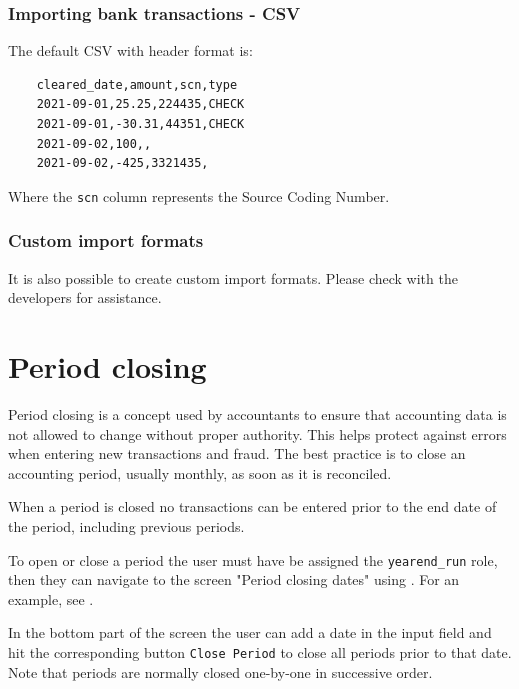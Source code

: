 \subsubsection{Importing bank transactions - CSV}
\label{subsec-importing-bank-transactions-csv}

The default CSV with header format is:
\begin{verbatim}
	cleared_date,amount,scn,type
	2021-09-01,25.25,224435,CHECK
	2021-09-01,-30.31,44351,CHECK
	2021-09-02,100,,
	2021-09-02,-425,3321435,
\end{verbatim}

Where the \texttt{scn} column represents the Source Coding Number.

\subsubsection{Custom import formats}
\label{subsec-importing-bank-transactions-custom}

It is also possible to create custom import  formats.  Please check with the developers for assistance.

\section{Period closing}
\label{sec-business-processes-accounting-period-closing}

Period closing is a concept used by accountants to ensure that accounting data is not allowed to change without proper authority.
This helps protect against errors when entering new transactions and fraud. 
The best practice is to close an accounting period, usually monthly, as soon as it is reconciled.

When a period is closed no transactions can be entered prior to the end date of the period, including previous periods.

To open or close a period the user must have be assigned the \texttt{yearend\_run} role, then they can navigate to the screen "Period closing dates" using .
For an example, see .

In the bottom part of the screen the user can add a date
in the input field and hit the corresponding button \texttt{Close Period} to close all periods prior to that date.
Note that periods are normally closed one-by-one in successive order.

